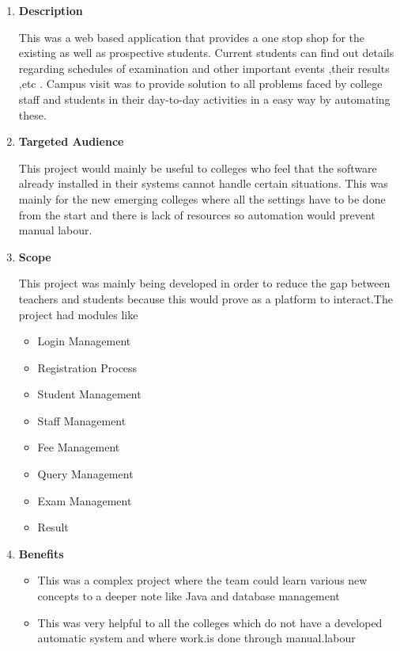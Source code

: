 \documentclass[fleqn,10pt]{../SelfArx} %
\begin{document}
\begin{enumerate}
\item \textbf{Description}

This was a web based application that provides a one stop shop for the existing as well as prospective students. Current students can find out details regarding schedules of examination and other important events ,their results ,etc . Campus visit was to provide solution to all problems faced by college staff and students in their day-to-day activities in a easy way by automating these. 

\item \textbf{Targeted Audience}

This project would mainly be useful to colleges who feel that the software already installed in their systems cannot handle certain situations. This was mainly for the new emerging colleges where all the settings have to be done from the start and there is lack of resources so automation would prevent manual labour.

\item \textbf{Scope}

This project was mainly being developed in order to reduce the gap between teachers and  students because this would prove as a platform to interact.The project had modules like
\begin{itemize}
    \item Login Management 
\item Registration Process 
\item Student Management 
\item Staff Management 
\item Fee Management 
\item Query Management 
\item Exam Management 
\item Result
\end{itemize}


\item \textbf{Benefits}
\begin{itemize}

\item This was a complex project where the team could learn various new concepts to a deeper note like Java and database management

\item This was very helpful to all the colleges which do not have a developed automatic system and where work.is done through manual.labour


\end{itemize}
\end{enumerate}
\end{document}
